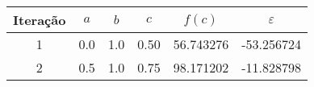 \begin{tabular}{cccccc}
\toprule
Iteração & $a$ & $b$ &  $c$ &    $f(c)$ & $\varepsilon$ \\
\midrule
       1 & 0.0 & 1.0 & 0.50 & 56.743276 &    -53.256724 \\
       2 & 0.5 & 1.0 & 0.75 & 98.171202 &    -11.828798 \\
\bottomrule
\end{tabular}
